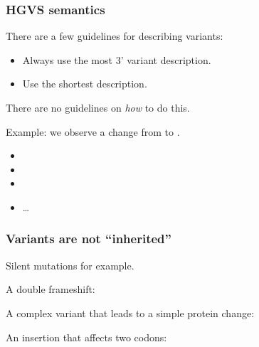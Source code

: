 \documentclass[slidestop]{beamer}
\begin{document}
\begin{frame}
  \frametitle{HGVS semantics}

  There are a few guidelines for describing variants:
  \begin{itemize}
    \item Always use the most 3' variant description.
    \item Use the shortest description.
  \end{itemize}
  \bigskip
  \pause

  There are no guidelines on \emph{how} to do this.
  \bigskip

  Example: we observe a change from  to .
  \begin{itemize}
    \item {}
    \item {}
    \item {}
    \item \ldots
  \end{itemize}
\end{frame}

\begin{frame}
  \frametitle{Variants are not ``inherited''}

  Silent mutations for example.
  \bigskip
  \pause

  A double frameshift:


  \bigskip
  \pause

  A complex variant that leads to a simple protein change:


  \bigskip
  \pause

  An insertion that affects two codons:


\end{frame}
\end{document}
